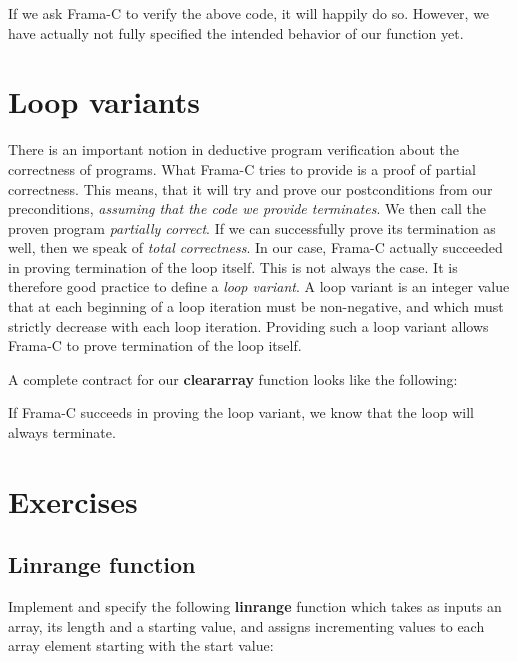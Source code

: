 
If we ask Frama-C to verify the above code, it will happily do so. However, we have actually not fully specified the intended behavior of our function yet. 

\section{Loop variants}

There is an important notion in deductive program verification about the correctness of programs. What Frama-C tries to provide is a proof of partial correctness. This means, that it will try and prove our postconditions from our preconditions, \emph{assuming that the code we provide terminates}. We then call the proven program \emph{partially correct}.  If we can successfully prove its termination as well, then we speak of \emph{total correctness}. In our case, Frama-C actually succeeded in proving termination of the loop itself. This is not always the case. It is therefore good practice to define a \emph{loop variant}. A loop variant is an integer value that at each beginning of a loop iteration must be non-negative, and which must strictly decrease with each loop iteration. Providing such a loop variant allows Frama-C to prove termination of the loop itself. 

A complete contract for our \textbf{clear\textunderscore array} function looks like the following:


If Frama-C succeeds in proving the loop variant, we know that the loop will always terminate. 

\section{Exercises}

\subsection{Linrange function}

Implement and specify the following \textbf{linrange} function which takes as inputs an array, its length and a starting value, and assigns incrementing values to each array element starting with the start value:


